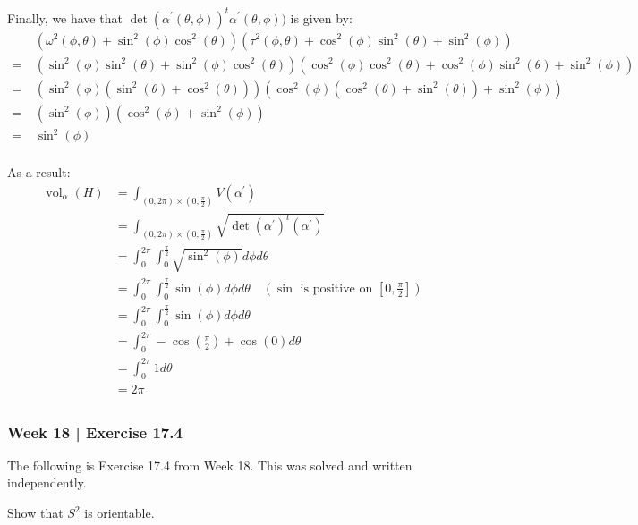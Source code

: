 \begin{pf}[source=Alan]
Finally, we have that $ \det(\alpha^\prime(\theta, \phi))^t\alpha^\prime
(\theta, \phi)) $
is given by:
\begin{align*}
    & \ (\omega^{2}(\phi, \theta) + \sin^{2}(\phi)\cos^{2}(\theta))
    (\tau^{2}(\phi, \theta)+\cos^{2}(\phi)\sin^{2}(\theta)+\sin^{2}(\phi)) \\
= & \ (\sin^2(\phi)\sin^2(\theta) + \sin^2(\phi)\cos^2(\theta))(\cos^2(\phi)
\cos^2(\theta) +
\cos^2(\phi)\sin^2(\theta) + \sin^2(\phi)) \\
 = & \ (\sin^2(\phi)(\sin^2(\theta) + \cos^2(\theta)))(\cos^2(\phi)
 (\cos^2(\theta) + \sin^2(\theta))
 + \sin^2(\phi)) \\
 = & \ (\sin^2(\phi))(\cos^2(\phi) + \sin^2(\phi)) \\
 = & \ \sin^2(\phi) \\
\end{align*}

As a result:
\begin{align*}
\operatorname{vol}_\alpha(H) &= \int_{(0, 2\pi) \times (0, \frac{\pi}{2})}
V(\alpha^\prime) \\
 &= \int_{(0, 2\pi) \times (0, \frac{\pi}{2})} \sqrt{ \det (\alpha^\prime)^t
 (\alpha^\prime)  } \\
 &= \int_{0}^{2\pi} \int_0^{\frac{\pi}{2}} \sqrt{ \sin^2(\phi)  }   d\phi d\theta
 \\
 &= \int_{0}^{2\pi} \int_0^{\frac{\pi}{2}} \sin(\phi)  d\phi d\theta \quad \left(
     \sin \text{ is
 positive on } \left[0, \frac{\pi}{2}\right]\right) \\
 &= \int_{0}^{2\pi} \int_0^{\frac{\pi}{2}} \sin(\phi)  d\phi d\theta \\
 &= \int_{0}^{2\pi} -\cos(\frac{\pi}{2}) + \cos(0)  d\theta \\
 &= \int_{0}^{2\pi} 1  d\theta \\
 &= 2\pi \\
\end{align*}
\end{pf}

\newpage
\subsubsection{Week 18 | Exercise 17.4}

The following is Exercise 17.4 from Week 18. This was solved and written
independently.

\begin{exr}[num=17.4]
    Show that $ S^{2} $ is orientable.
\end{exr}

